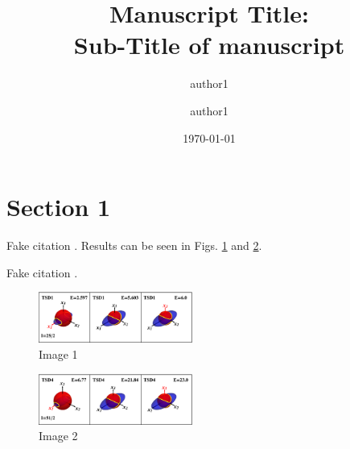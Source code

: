 \documentclass[%
 reprint,
 amsmath,
 amssymb,
 aps,
]{revtex4-2}
\begin{document}
\title{Manuscript Title:\\Sub-Title of manuscript }%

\author{author1}%
\author{author1}%
%


\date{\today}

\begin{abstract}
\lipsum[1]
\end{abstract}

\maketitle


\section{Section 1}

\lipsum[1-2] Fake citation \cite{guo2020risk}. Results can be seen in Figs. \ref{fig:image-1} and \ref{fig:image-2}.

\lipsum[1] Fake citation \cite{chakraborty2020multiphonon}.


\begin{figure}
    \centering
    \includegraphics[width=0.45\textwidth]{images/energy_ellipsoids/tsd1_spin1.eps}
    \caption{Image 1}
    \label{fig:image-1}
\end{figure}


\begin{figure}
    \centering
    \includegraphics[width=0.45\textwidth]{images/energy_ellipsoids/tsd4_spin2.eps}
    \caption{Image 2}
    \label{fig:image-2}
\end{figure}


\end{document}
